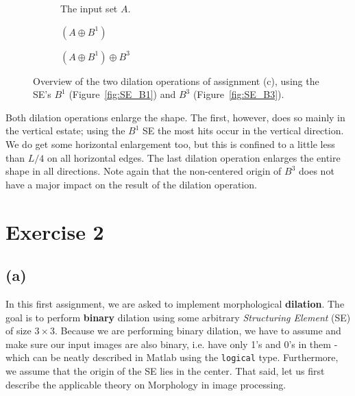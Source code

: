 \documentclass{article}
\begin{document}
\begin{figure}[H]
     \centering
     \begin{subfigure}[b]{0.27\textwidth}
         \centering
         
         \caption{The input set $A$.}
         \label{fig:ex1_c-inputset}
     \end{subfigure}
     \hfill
     \begin{subfigure}[b]{0.29\textwidth}
         \centering
         
         \caption{$(A \oplus B^1)$}
         \label{fig:ex1_c-step1}
     \end{subfigure}
     \hfill
     \begin{subfigure}[b]{0.37\textwidth}
         \centering
         
         \caption{$(A \oplus B^1) \oplus B^3$}
         \label{fig:ex1_c-step2}
     \end{subfigure}
     
    \caption{Overview of the two dilation operations of assignment (c), using the SE's $B^1$ (Figure~\ref{fig:SE_B1}) and $B^3$ (Figure~\ref{fig:SE_B3}).}
    \label{fig:ex1_c}
\end{figure}

Both dilation operations enlarge the shape. The first, however, does so mainly in the vertical estate; using the $B^1$ SE the most hits occur in the vertical direction. We do get some horizontal enlargement too, but this is confined to a little less than $L/4$ on all horizontal edges. The last dilation operation enlarges the entire shape in all directions. Note again that the non-centered origin of $B^3$ does not have a major impact on the result of the dilation operation.

\section*{Exercise 2}
\subsection*{(a)}
In this first assignment, we are asked to implement morphological \textbf{dilation}. The goal is to perform \textbf{binary} dilation using some arbitrary \textit{Structuring Element} (SE) of size $3 \times 3$. Because we are performing binary dilation, we have to assume and make sure our input images are also binary, i.e. have only 1's and 0's in them - which can be neatly described in Matlab using the \texttt{logical} type. Furthermore, we assume that the origin of the SE lies in the center. That said, let us first describe the applicable theory on Morphology in image processing.
\end{document}
